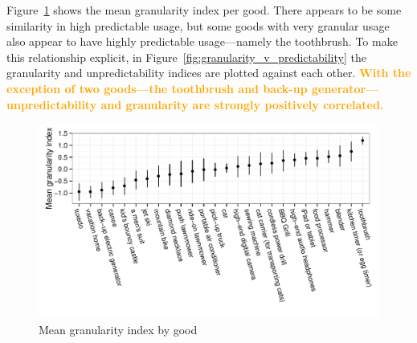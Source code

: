 \documentclass[11pt]{article}
\newcommand{\important}[1]{\textcolor{orange}{\textbf{#1}}}
\newcommand{\important}[1]{#1}
\begin{document}
Figure~\ref{fig:granularity} shows the mean granularity index per good. 
There appears to be some similarity in high predictable usage, but some goods with very granular usage also appear to have highly predictable usage---namely the toothbrush. 
To make this relationship explicit, in Figure~\ref{fig:granularity_v_predictability} the granularity and unpredictability indices are plotted against each other. 
\important{With the exception of two goods---the toothbrush and back-up generator---unpredictability and granularity are strongly positively correlated.}

\begin{figure}
\centering 
\caption{Mean granularity index by good \label{fig:granularity}}
\begin{minipage}{0.90 \linewidth}
\includegraphics[width = \linewidth]{./plots/granularity.pdf} 
\end{minipage} 
\end{figure} 
\end{document}

